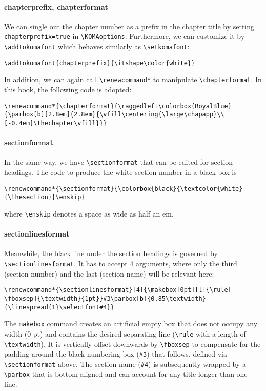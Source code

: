 \paragraph{chapterprefix, chapterformat}
We can single out the chapter number as a prefix in the chapter title by setting \texttt{chapterprefix=true} in \texttt{\textbackslash KOMAoptions}. Furthermore, we can customize it by \texttt{\textbackslash addtokomafont} which behaves similarly as \texttt{\textbackslash setkomafont}:
\begin{lstlisting}
\addtokomafont{chapterprefix}{\itshape\color{white}}
\end{lstlisting}
In addition, we can again call \texttt{\textbackslash renewcommand*} to manipulate \texttt{\textbackslash chapterformat}. In this book, the following code is adopted:
\begin{lstlisting}
\renewcommand*{\chapterformat}{\raggedleft\colorbox{RoyalBlue}{\parbox[b][2.8em]{2.8em}{\vfill\centering{\large\chapapp}\\[-0.4em]\thechapter\vfill}}}  
\end{lstlisting}

\paragraph{sectionformat}
In the same way, we have \texttt{\textbackslash sectionformat} that can be edited for section headings. The code to produce the white section number in a black box is
\begin{lstlisting}
\renewcommand*{\sectionformat}{\colorbox{black}{\textcolor{white}{\thesection}}\enskip}    
\end{lstlisting}
where \texttt{\textbackslash enskip} denotes a space as wide as half an em.

\paragraph{sectionlinesformat}
Meanwhile, the black line under the section headings is governed by \texttt{\textbackslash sectionlinesformat}. It has to accept $4$ arguments, where only the third (section number) and the last (section name) will be relevant here:
\begin{lstlisting}
\renewcommand*{\sectionlinesformat}[4]{\makebox[0pt][l]{\rule[-\fboxsep]{\textwidth}{1pt}}#3\parbox[b]{0.85\textwidth}{\linespread{1}\selectfont#4}}
\end{lstlisting}
The \texttt{makebox} command creates an artificial empty box that does not occupy any width ($0$ pt) and contains the desired separating line (\texttt{\textbackslash rule} with a length of \texttt{\textbackslash textwidth}). It is vertically offset downwards by \texttt{\textbackslash fboxsep} to compensate for the padding around the black numbering box (\texttt{\#3}) that follows, defined via \texttt{\textbackslash sectionformat} above. The section name (\texttt{\#4}) is subsequently wrapped by a \texttt{\textbackslash parbox} that is bottom-aligned and can account for any title longer than one line.


